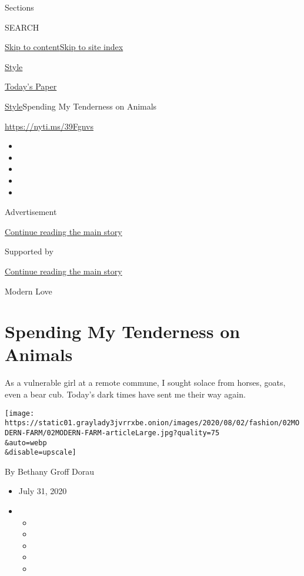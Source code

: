 Sections

SEARCH

\protect\hyperlink{site-content}{Skip to
content}\protect\hyperlink{site-index}{Skip to site index}

\href{https://www.nytimes3xbfgragh.onion/section/style}{Style}

\href{https://myaccount.nytimes3xbfgragh.onion/auth/login?response_type=cookie\&client_id=vi}{}

\href{https://www.nytimes3xbfgragh.onion/section/todayspaper}{Today's
Paper}

\href{/section/style}{Style}\textbar{}Spending My Tenderness on Animals

\href{https://nyti.ms/39Fgnvs}{https://nyti.ms/39Fgnvs}

\begin{itemize}
\item
\item
\item
\item
\item
\end{itemize}

Advertisement

\protect\hyperlink{after-top}{Continue reading the main story}

Supported by

\protect\hyperlink{after-sponsor}{Continue reading the main story}

Modern Love

\hypertarget{spending-my-tenderness-on-animals}{%
\section{Spending My Tenderness on
Animals}\label{spending-my-tenderness-on-animals}}

As a vulnerable girl at a remote commune, I sought solace from horses,
goats, even a bear cub. Today's dark times have sent me their way again.

\texttt{[image: https://static01.graylady3jvrrxbe.onion/images/2020/08/02/fashion/02MODERN-FARM/02MODERN-FARM-articleLarge.jpg?quality=75\\\&auto=webp\\\&disable=upscale]}

By Bethany Groff Dorau

\begin{itemize}
\item
  July 31, 2020
\item
  \begin{itemize}
  \item
  \item
  \item
  \item
  \item
  \end{itemize}
\end{itemize}

